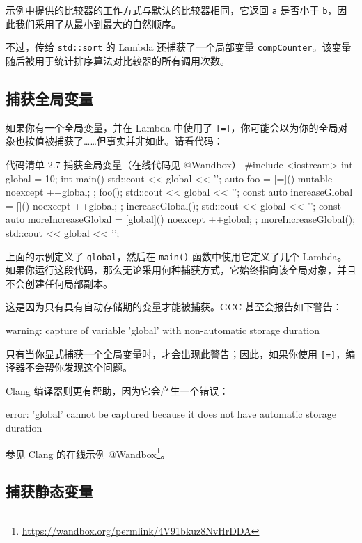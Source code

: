 \begin{codebox}
示例中提供的比较器的工作方式与默认的比较器相同，它返回 \texttt{a} 是否小于 \texttt{b}，因此我们采用了从最小到最大的自然顺序。

不过，传给 \texttt{std::sort} 的 Lambda 还捕获了一个局部变量 \texttt{compCounter}。该变量随后被用于统计排序算法对比较器的所有调用次数。

\subsection{捕获全局变量}

如果你有一个全局变量，并在 Lambda 中使用了 \texttt{[=]}，你可能会以为你的全局对象也按值被捕获了……但事实并非如此。请看代码：

\begin{codeboxt}{代码清单 2.7 捕获全局变量（在线代码见 @Wandbox）}
#include <iostream>
int global = 10;
int main() {
std::cout << global << '\n';
auto foo = [=]() mutable noexcept { ++global; };
foo();
std::cout << global << '\n';
const auto increaseGlobal = []() noexcept { ++global; };
increaseGlobal();
std::cout << global << '\n';
const auto moreIncreaseGlobal = [global]() noexcept { ++global; };
moreIncreaseGlobal();
std::cout << global << '\n';
}
\end{codeboxt}

上面的示例定义了 \texttt{global}，然后在 \texttt{main()} 函数中使用它定义了几个 Lambda。如果你运行这段代码，那么无论采用何种捕获方式，它始终指向该全局对象，并且不会创建任何局部副本。

这是因为只有具有自动存储期的变量才能被捕获。GCC 甚至会报告如下警告：

\begin{codebox}
warning: capture of variable 'global' with non-automatic
storage duration
\end{codebox}

只有当你显式捕获一个全局变量时，才会出现此警告；因此，如果你使用 \texttt{[=]}，编译器不会帮你发现这个问题。

Clang 编译器则更有帮助，因为它会产生一个错误：

\begin{codebox}
error: 'global' cannot be captured because it does not have
automatic storage duration
\end{codebox}

参见 Clang 的在线示例 @Wandbox\footnote{\url{https://wandbox.org/permlink/4V91bkuz8NvHrDDA}}。

\subsection{捕获静态变量}


\end{codebox}
